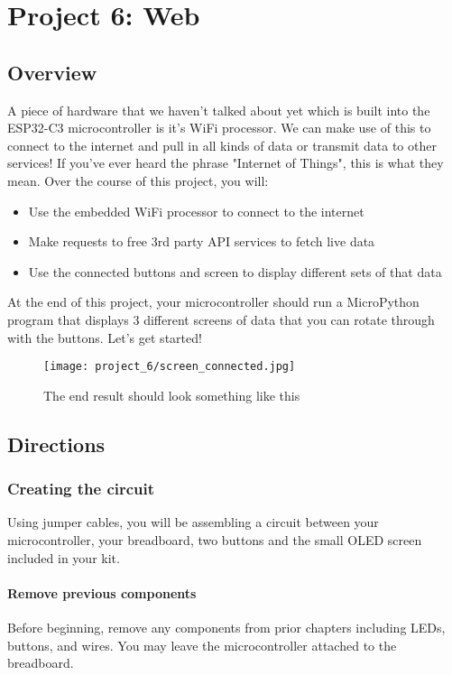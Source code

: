 \chapter{Project 6: Web}

\section{Overview}
A piece of hardware that we haven't talked about yet which is built into the ESP32-C3 microcontroller
is it's WiFi processor. We can make use of this to connect to the internet and pull in all kinds of
data or transmit data to other services! If you've ever heard the phrase "Internet of Things", this
is what they mean. Over the course of this project, you will:
\begin{itemize}
    \item Use the embedded WiFi processor to connect to the internet
    \item Make requests to free 3rd party API services to fetch live data
    \item Use the connected buttons and screen to display different sets of that data
\end{itemize}
At the end of this project, your microcontroller should run a MicroPython program that displays 3
different screens of data that you can rotate through with the buttons. Let's get started!
\begin{figure}[H]
\centering
    \texttt{[image: project\_6/screen\_connected.jpg]}
    \caption{The end result should look something like this}
\end{figure}

\pagebreak

\section{Directions}

\subsection{Creating the circuit}
Using jumper cables, you will be assembling a circuit between your microcontroller, your breadboard, two
buttons and the small OLED screen included in your kit.

\subsubsection{Remove previous components}
Before beginning, remove any components from prior chapters including LEDs, buttons, and wires. You may leave the
microcontroller attached to the breadboard.

